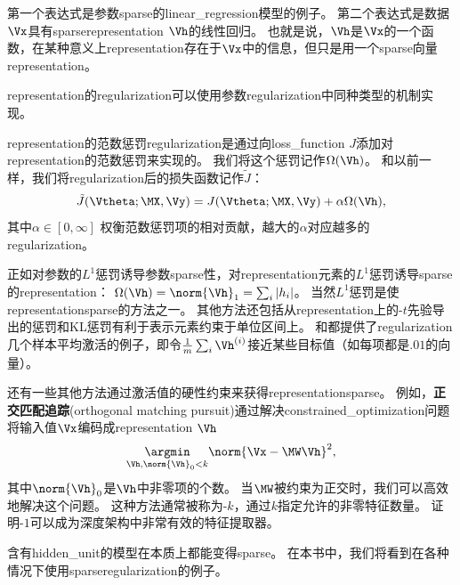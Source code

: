 
第一个表达式是参数\gls{sparse}的\gls{linear_regression}模型的例子。
第二个表达式是数据$\Vx$具有\gls{sparse}\gls{representation} $\Vh$的线性回归。
也就是说，$\Vh$是$\Vx$的一个函数，在某种意义上\gls{representation}存在于$\Vx$中的信息，但只是用一个\gls{sparse}向量\gls{representation}。

\gls{representation}的\gls{regularization}可以使用参数\gls{regularization}中同种类型的机制实现。

\gls{representation}的范数惩罚\gls{regularization}是通过向\gls{loss_function} $J$添加对\gls{representation}的范数惩罚来实现的。
我们将这个惩罚记作$\Omega(\Vh)$。
和以前一样，我们将\gls{regularization}后的损失函数记作$\tilde J$：
\begin{align}
 \tilde J(\Vtheta; \MX, \Vy) =  J(\Vtheta; \MX, \Vy)  + \alpha \Omega(\Vh),
\end{align}
其中$\alpha \in [0, \infty]$ 权衡范数惩罚项的相对贡献，越大的$\alpha$对应越多的\gls{regularization}。

正如对参数的$L^1$惩罚诱导参数\gls{sparse}性，对\gls{representation}元素的$L^1$惩罚诱导\gls{sparse}的\gls{representation}：
$\Omega(\Vh) = \norm{\Vh}_1 = \sum_i |h_i|$。
当然$L^1$惩罚是使\gls{representation}\gls{sparse}的方法之一。
其他方法还包括从\gls{representation}上的-$t$先验导出的惩罚\citep{Olshausen-Field-1996,Bergstra-2011}和\gls{KL}惩罚\citep{Larochelle-Bengio-2008}有利于表示元素约束于单位区间上。
\cite{Lee-et-al-2008}和\cite{Goodfellow-et-al-2009}都提供了\gls{regularization}几个样本平均激活的例子，即令$\frac{1}{m}\sum_i \Vh^{(i)}$接近某些目标值（如每项都是$.01$的向量）。

还有一些其他方法通过激活值的硬性约束来获得\gls{representation}\gls{sparse}。
例如，\textbf{正交匹配追踪}(orthogonal matching pursuit)\citep{Pati-et-al-1993}通过解决\gls{constrained_optimization}问题将输入值$\Vx$编码成\gls{representation} $\Vh$
\begin{align}
 \underset{\Vh, \norm{\Vh}_0 < k}{\argmin} \norm{\Vx - \MW \Vh}^2,
\end{align}
其中$\norm{\Vh}_0 $是$\Vh$中非零项的个数。
当$\MW$被约束为正交时，我们可以高效地解决这个问题。
这种方法通常被称为-$k$，通过$k$指定允许的非零特征数量。
\cite{Coates-Ng-2011}证明-$1$可以成为深度架构中非常有效的特征提取器。


含有\gls{hidden_unit}的模型在本质上都能变得\gls{sparse}。
在本书中，我们将看到在各种情况下使用\gls{sparse}\gls{regularization}的例子。

